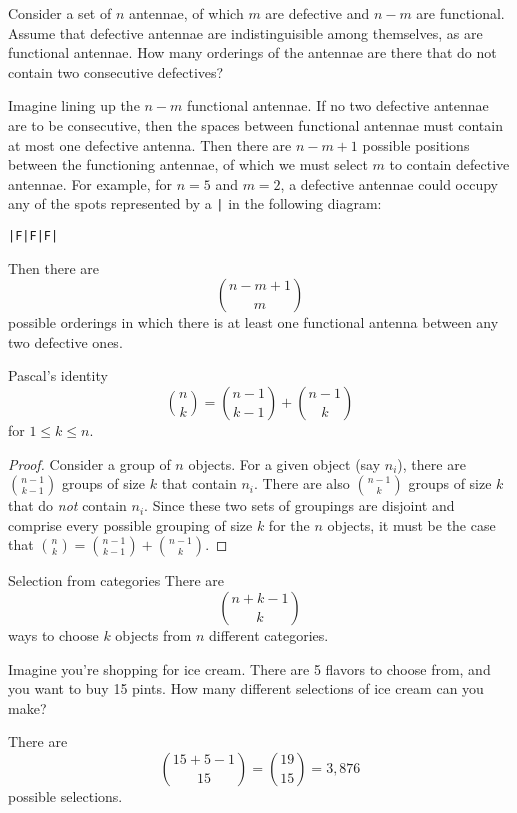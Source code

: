 \begin{changebar}
    \begin{example}
        Consider a set of $n$ antennae, of which $m$ are defective and $n-m$ are functional. Assume that defective antennae are indistinguisible among themselves, as are functional antennae. How many orderings of the antennae are there that do not contain two consecutive defectives?
    \end{example}
    \begin{solution}
        Imagine lining up the $n-m$ functional antennae. If no two defective antennae are to be consecutive, then the spaces between functional antennae must contain at most one defective antenna. Then there are $n-m+1$ possible positions between the functioning antennae, of which we must select $m$ to contain defective antennae. For example, for $n = 5$ and $m = 2$, a defective antennae could occupy any of the spots represented by a \texttt{|} in the following diagram:
        \begin{center}
            \texttt{|F|F|F|}
        \end{center}
        Then there are \[
            \binom{n-m+1}{m}    
            \] possible orderings in which there is at least one functional antenna between any two defective ones. 
        \end{solution}
\end{changebar}
\begin{bdef}{Pascal's identity}\label{pid}
    \[
        \binom{n}{k} = \binom{n-1}{k - 1} + \binom{n - 1}{k}    
    \] for $1 \leq k \leq n$.
\end{bdef}
\begin{proof}
    Consider a group of $n$ objects. For a given object (say $n_i$), there are $\displaystyle \binom{n-1}{k-1}$ groups of size $k$ that contain $n_i$. There are also $\displaystyle \binom{n-1}{k}$ groups of size $k$ that do \emph{not} contain $n_i$. Since these two sets of groupings are disjoint and comprise every possible grouping of size $k$ for the $n$ objects, it must be the case that $\displaystyle \binom{n}{k} = \binom{n-1}{k-1} + \binom{n-1}{k}$.
\end{proof}

\begin{bdef}{Selection from categories}
    There are \[
        \binom{n+k-1}{k}    
    \] ways to choose $k$ objects from $n$ different categories.
\end{bdef}

\begin{changebar}
    \begin{example}
        Imagine you're shopping for ice cream. There are 5 flavors to choose from, and you want to buy 15 pints. How many different selections of ice cream can you make?
    \end{example}
    \begin{solution}
        There are \[
            \binom{15 + 5 - 1}{15} = \binom{19}{15} = 3{,}876    
            \] possible selections.
        \end{solution}
    \end{changebar}

